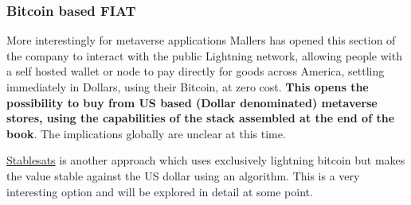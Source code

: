 \begin{itemize}
\subsubsection{Bitcoin based FIAT}
More interestingly for metaverse applications Mallers has opened this section of the company to interact with the public Lightning network, allowing people with a self hosted wallet or node to pay directly for goods across America, settling immediately in Dollars, using their Bitcoin, at zero cost. \textbf{This opens the possibility to buy from US based (Dollar denominated) metaverse stores, using the capabilities of the stack assembled at the end of the book}. The implications globally are unclear at this time.\par
\href{https://stablesats.com/}{Stablesats} is another approach which uses exclusively lightning bitcoin but makes the value stable against the US dollar using an algorithm. This is a very interesting option and will be explored in detail at some point.

\end{itemize}

